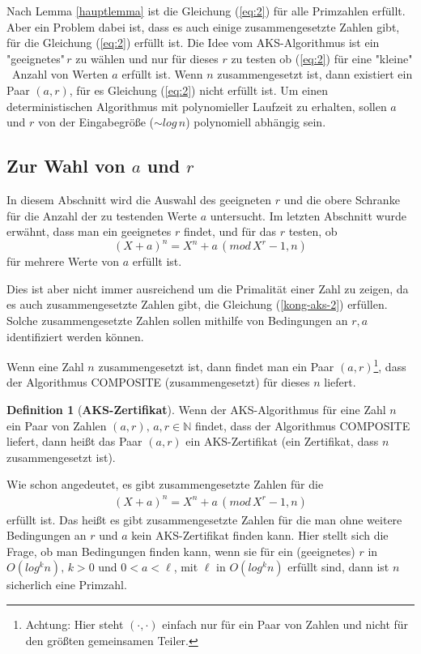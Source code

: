\documentclass[12pt,oneside]{article}
\theoremstyle{remark}
\theoremstyle{definition}
\newtheorem{definition}{Definition}[section]
\begin{document}
\begin{flushleft}
Nach Lemma \ref{hauptlemma} ist die Gleichung (\ref{eq:2}) für alle Primzahlen erfüllt. Aber ein Problem dabei ist, dass es auch einige zusammengesetzte Zahlen gibt, für die Gleichung (\ref{eq:2}) erfüllt ist. Die Idee vom AKS-Algorithmus ist ein "geeignetes"$\, r$ zu wählen und nur für dieses $r$ zu testen ob (\ref{eq:2}) für eine "kleine" $\,$ Anzahl von Werten $a$ erfüllt ist. Wenn $n$ zusammengesetzt ist, dann existiert ein Paar $(a,r)$, für es Gleichung (\ref{eq:2}) nicht erfüllt ist. Um einen deterministischen Algorithmus mit polynomieller Laufzeit zu erhalten, sollen $a$ und $r$ von der Eingabegröße ($ \sim log \, n$) polynomiell abhängig sein. 

\subsection{Zur Wahl von $a$ und $r$}\label{absch32}
In diesem Abschnitt wird die Auswahl des geeigneten $r$ und die obere Schranke für die Anzahl der zu testenden Werte $a$ untersucht. Im letzten Abschnitt wurde erwähnt, dass man ein geeignetes $r$ findet, und für das $r$ testen, ob 
\begin{equation}\label{kong-aks-2}
    (X + a)^n = X^n + a \, (mod \, X^r - 1, n)
\end{equation}
für mehrere Werte von $a$ erfüllt ist.

Dies ist aber nicht immer ausreichend um die Primalität einer Zahl zu zeigen, da es auch zusammengesetzte Zahlen gibt, die Gleichung (\ref{kong-aks-2}) erfüllen. Solche zusammengesetzte Zahlen sollen mithilfe von Bedingungen an $r,a$ identifiziert werden können.

Wenn eine Zahl $n$ zusammengesetzt ist, dann findet man ein Paar $(a,r)$\footnote{Achtung: Hier steht $(\cdot,\cdot)$ einfach nur für ein Paar von Zahlen und nicht für den größten gemeinsamen Teiler.}, dass der Algorithmus COMPOSITE (zusammengesetzt) für dieses $n$ liefert.

\begin{definition}[\textbf{AKS-Zertifikat}]
Wenn der AKS-Algorithmus für eine Zahl $n$ ein Paar von Zahlen $(a,r), \, a,r \in \mathbb{N}$ findet, dass der Algorithmus COMPOSITE liefert, dann heißt das Paar $(a,r)$ ein AKS-Zertifikat (ein Zertifikat, dass $n$ zusammengesetzt ist). 
\end{definition}

Wie schon angedeutet, es gibt zusammengesetzte Zahlen für die 
\begin{align*}\label{iden-aks}
    (X + a)^n = X^n + a \, (mod  \, X^r - 1, n)
\end{align*}
erfüllt ist. Das heißt es gibt zusammengesetzte Zahlen für die man ohne weitere Bedingungen an $r$ und $a$ kein AKS-Zertifikat finden kann. Hier stellt sich die Frage, ob man Bedingungen finden kann, wenn sie für ein (geeignetes) $r$ in $O(log^k n), \, k > 0$ und $ 0 < a < \ell$, mit $ \ell$ in $O(log^k n)$ erfüllt sind, dann ist $n$ sicherlich eine Primzahl.


\end{flushleft}
\end{document}
